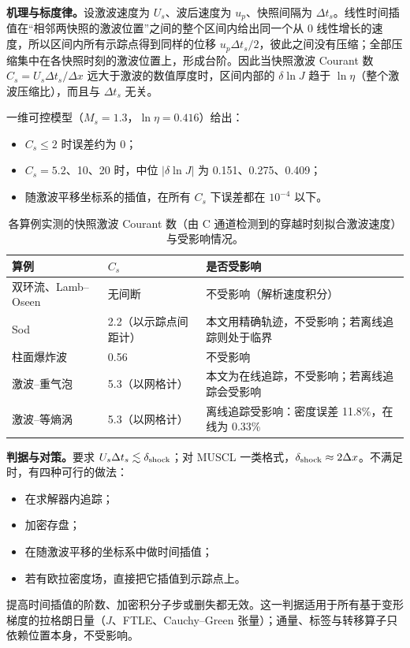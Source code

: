 \documentclass[10.5pt,a4paper]{article}
\begin{document}
\textbf{机理与标度律。}设激波速度为 $U_s$、波后速度为 $u_p$、快照间隔为 $\Delta t_s$。线性时间插值在“相邻两快照的激波位置”之间的整个区间内给出同一个从 0 线性增长的速度，所以区间内所有示踪点得到同样的位移 $u_p\Delta t_s/2$，彼此之间没有压缩；全部压缩集中在各快照时刻的激波位置上，形成台阶。因此当快照激波 Courant 数 $C_s=U_s\Delta t_s/\Delta x$ 远大于激波的数值厚度时，区间内部的 $\delta\ln J$ 趋于 $\ln\eta$（整个激波压缩比），而且与 $\Delta t_s$ 无关。

一维可控模型（$M_s=1.3$，$\ln\eta=0.416$）给出：
\begin{itemize}
\item $C_s\le2$ 时误差约为 0；
\item $C_s=5.2$、10、20 时，中位 $|\delta\ln J|$ 为 0.151、0.275、0.409；
\item 随激波平移坐标系的插值，在所有 $C_s$ 下误差都在 $10^{-4}$ 以下。
\end{itemize}

\begin{table}[H]\centering\small
\caption{各算例实测的快照激波 Courant 数（由 C 通道检测到的穿越时刻拟合激波速度）与受影响情况。}
\begin{tabularx}{\linewidth}{@{}lYY@{}}\toprule
算例 & $C_s$ & 是否受影响 \\\midrule
双环流、Lamb–Oseen & 无间断 & 不受影响（解析速度积分） \\
Sod & 2.2（以示踪点间距计） & 本文用精确轨迹，不受影响；若离线追踪则处于临界 \\
柱面爆炸波 & 0.56 & 不受影响 \\
激波–重气泡 & 5.3（以网格计） & 本文为在线追踪，不受影响；若离线追踪会受影响 \\
激波–等熵涡 & 5.3（以网格计） & 离线追踪受影响：密度误差 11.8\%，在线为 0.33\% \\
\bottomrule\end{tabularx}
\end{table}

\textbf{判据与对策。}要求 $U_s\Delta t_s\lesssim\delta_{\rm shock}$；对 MUSCL 一类格式，$\delta_{\rm shock}\approx2\Delta x$。不满足时，有四种可行的做法：
\begin{itemize}
\item 在求解器内追踪；
\item 加密存盘；
\item 在随激波平移的坐标系中做时间插值；
\item 若有欧拉密度场，直接把它插值到示踪点上。
\end{itemize}
提高时间插值的阶数、加密积分子步或删失都无效。这一判据适用于所有基于变形梯度的拉格朗日量（$J$、FTLE、Cauchy–Green 张量）；通量、标签与转移算子只依赖位置本身，不受影响。
\end{document}
